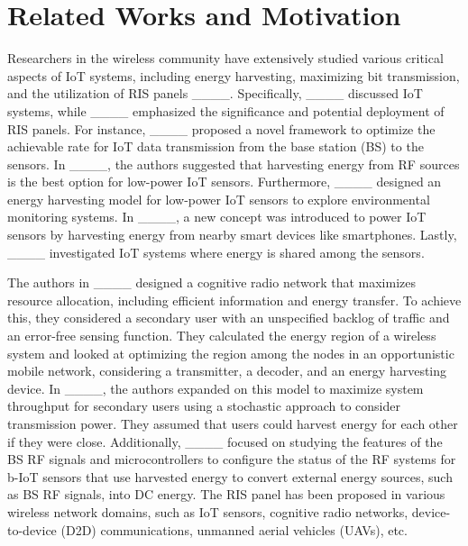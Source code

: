 \section{Related Works and Motivation}
Researchers in the wireless community have extensively studied various critical aspects of IoT systems, including energy harvesting, maximizing bit transmission, and the utilization of RIS panels ____. Specifically, ____ discussed IoT systems, while ____ emphasized the significance and potential deployment of RIS panels.
For instance, ____ proposed a novel framework to optimize the achievable rate for IoT data transmission from the base station (BS) to the sensors. In ____, the authors suggested that harvesting energy from RF sources is the best option for low-power IoT sensors. Furthermore, ____ designed an energy harvesting model for low-power IoT sensors to explore environmental monitoring systems. In ____, a new concept was introduced to power IoT sensors by harvesting energy from nearby smart devices like smartphones. Lastly, ____ investigated IoT systems where energy is shared among the sensors.


The authors in ____ designed a cognitive radio network that maximizes resource allocation, including efficient information and energy transfer. To achieve this, they considered a secondary user with an unspecified backlog of traffic and an error-free sensing function. They calculated the energy region of a wireless system and looked at optimizing the region among the nodes in an opportunistic mobile network, considering a transmitter, a decoder, and an energy harvesting device. In ____, the authors expanded on this model to maximize system throughput for secondary users using a stochastic approach to consider transmission power. They assumed that users could harvest energy for each other if they were close. Additionally, ____ focused on studying the features of the BS RF signals and microcontrollers to configure the status of the RF systems for b-IoT sensors that use harvested energy to convert external energy sources, such as BS RF signals, into DC energy.
The RIS panel has been proposed in various wireless network domains, such as IoT sensors, cognitive radio networks, device-to-device (D2D) communications, unmanned aerial vehicles (UAVs), etc.

